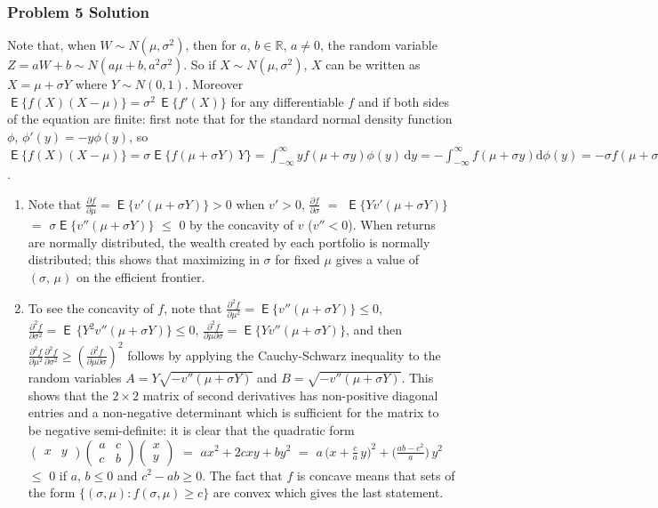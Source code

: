 \documentclass[10pt,handout]{beamer}
\newcommand{\ds}{\displaystyle}
\DeclareMathOperator\expc{\mathsf{E}}
\theoremstyle{definition}
\begin{document}
\begin{frame}[allowframebreaks]
  \frametitle{Problem 5 Solution}
  Note that, when $\ds W \sim N(\mu, \sigma^2)$, then for $a$, $b\in\mathbb{R}$, $a\ne 0$, the random variable $\ds Z = a W + b\sim N(a\mu + b, a^2\sigma^2)$. So if $X\sim N(\mu, \sigma^2)$, $X$ can be written as $X = \mu + \sigma Y$ where $Y\sim N(0,1)$. Moreover $\ds\expc\big\{f(X)(X - \mu)\big\} = \sigma^2\,\expc\big\{f'(X)\big\}$ for any differentiable $f$ and if both sides of the equation are finite: first note that for the standard normal density function $\phi$, $\phi'(y) = -y\phi(y)$, so $\ds\expc\big\{f(X)(X - \mu)\big\} = \sigma\expc\big\{f(\mu + \sigma Y)\,Y\big\} = \int_{-\infty}^{\infty}yf(\mu + \sigma y)\phi(y)\,\text{d}y = -\int_{-\infty}^{\infty}f(\mu + \sigma y)\text{d}\phi(y) = -\sigma f(\mu + \sigma y)\phi(y)\,\Big|_{-\infty}^{\infty} + \sigma^2\int_{-\infty}^{\infty}f'(\mu + \sigma y)\phi(y)\text{d}y = \sigma^2\int_{-\infty}^{\infty}f'(\mu + \sigma y)\phi(y)\text{d}y = \sigma^2\expc\big\{f'(X)\big\}$.
  \begin{enumerate}
    \item Note that $\ds\frac{\partial f}{\partial \mu} = \expc\{v'(\mu + \sigma Y)\} > 0$ when $\ds v' > 0$, $\ds\frac{\partial f}{\partial\sigma}$ $=$ $\ds\expc\{Yv'(\mu + \sigma Y)\}$ $=$ $\ds\sigma \expc\{v''(\mu + \sigma Y)\}$ $\leqslant$ $0$ by the concavity of $v$ ($v'' < 0$). When returns are normally distributed, the wealth created by each portfolio is normally distributed; this shows that maximizing in $\sigma$ for fixed $\mu$ gives a value of $(\sigma,\,\mu)$ on the efficient frontier.
    \item To see the concavity of $f$, note that $\ds\frac{\partial^2 f}{\partial \mu^2} = \expc\{v''(\mu + \sigma Y)\} \leqslant 0$, $\ds\frac{\partial^2 f}{\partial \sigma^2} = \expc\,\{Y^2v''(\mu + \sigma Y)\} \leqslant 0$, $\ds \frac{\partial^2 f}{\partial \mu \partial \sigma} = \expc\{Yv''(\mu + \sigma Y)\}$, and then $\ds\frac{\partial^2 f}{\partial \mu^2}\frac{\partial^2 f}{\partial \sigma^2} \geqslant \left(\frac{\partial^2 f}{\partial \mu \partial \sigma}\right)^2$ follows by applying the Cauchy-Schwarz inequality to the random variables $A = Y\sqrt{-v''(\mu + \sigma Y)}$ and $B = \sqrt{-v''(\mu + \sigma Y)}$. This shows that the $2 \times 2$ matrix of second derivatives has non-positive diagonal entries and a non-negative determinant which is sufficient for the matrix to be negative semi-definite: it is clear that the quadratic form $\ds\begin{pmatrix}x & y\end{pmatrix}\begin{pmatrix}a & c\\ c & b\end{pmatrix}\begin{pmatrix}x \\ y\end{pmatrix}$ $=$ $\ds ax^2 + 2cxy + by^2$ $=$ $\ds a\,\Big(x + \frac{c}{a}\,y\Big)^2 + \Big(\frac{ab - c^2}{a}\Big)\,y^2$ \\$\leqslant$ $0$ if $a$, $b\leqslant 0$ and $c^2 - ab\geqslant 0$. The fact that $f$ is concave means that sets of the form $\{(\sigma,\mu) : f(\sigma,\mu) \geqslant c\}$ are convex which gives the last statement.

\end{enumerate}
\end{frame}
\end{document}
